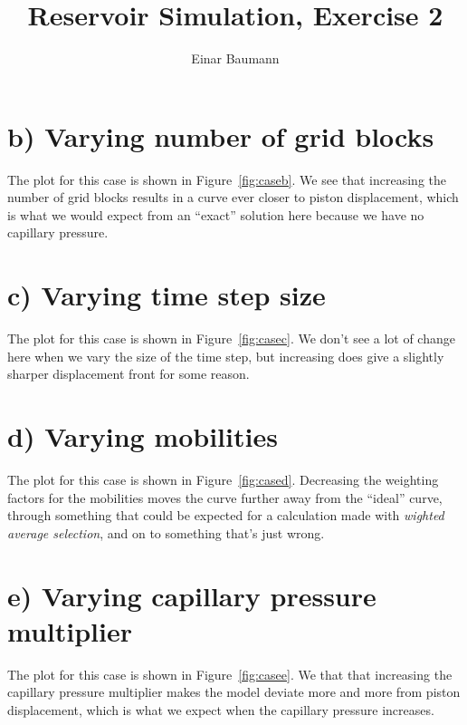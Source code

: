 





\title{Reservoir Simulation, Exercise 2}
\author{Einar Baumann}
\maketitle
\thispagestyle{empty}


\section*{b) Varying number of grid blocks} %
\label{sec:b_varying_number_of_grid_blocks}
The plot for this case is shown in Figure~\ref{fig:caseb}. We see that increasing the number of grid blocks results in a curve ever closer to piston displacement, which is what we would expect from an ``exact'' solution here because we have no capillary pressure.


\section*{c) Varying time step size} %
\label{sec:c_varying_time_step_size}
The plot for this case is shown in Figure~\ref{fig:casec}. We don't see a lot of change here when we vary the size of the time step, but increasing does give a slightly sharper displacement front for some reason.


\section*{d) Varying mobilities} %
\label{sec:d_varying_mobilities}
The plot for this case is shown in Figure~\ref{fig:cased}. Decreasing the weighting factors for the mobilities moves the curve further away from the ``ideal'' curve, through something that could be expected for a calculation made with \emph{wighted average selection}, and on to something that's just wrong.


\section*{e) Varying capillary pressure multiplier} %
\label{sec:e_varying_capillary_pressure_multiplier}
The plot for this case is shown in Figure~\ref{fig:casee}. We that that increasing the capillary pressure multiplier makes the model deviate more and more from piston displacement, which is what we expect when the capillary pressure increases.



